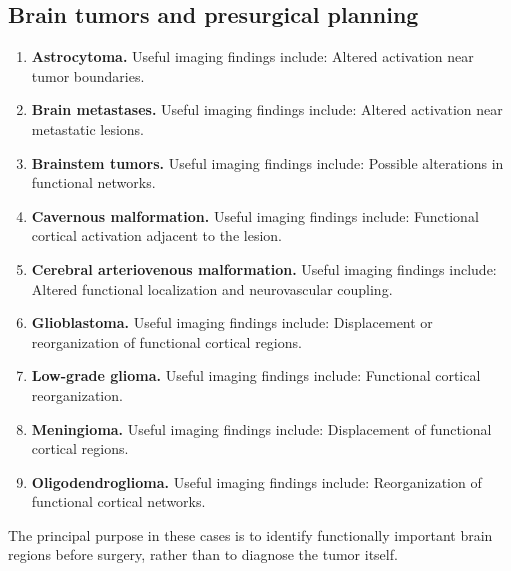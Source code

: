 \subsection{Brain tumors and presurgical planning}
\begin{enumerate}[leftmargin=*,itemsep=0.45em,topsep=0.4em]
\item \textbf{Astrocytoma.} Useful imaging findings include: Altered activation near tumor boundaries.
\item \textbf{Brain metastases.} Useful imaging findings include: Altered activation near metastatic lesions.
\item \textbf{Brainstem tumors.} Useful imaging findings include: Possible alterations in functional networks.
\item \textbf{Cavernous malformation.} Useful imaging findings include: Functional cortical activation adjacent to the lesion.
\item \textbf{Cerebral arteriovenous malformation.} Useful imaging findings include: Altered functional localization and neurovascular coupling.
\item \textbf{Glioblastoma.} Useful imaging findings include: Displacement or reorganization of functional cortical regions.
\item \textbf{Low-grade glioma.} Useful imaging findings include: Functional cortical reorganization.
\item \textbf{Meningioma.} Useful imaging findings include: Displacement of functional cortical regions.
\item \textbf{Oligodendroglioma.} Useful imaging findings include: Reorganization of functional cortical networks.
\end{enumerate}
The principal purpose in these cases is to identify functionally important brain regions before surgery, rather than to diagnose the tumor itself.

